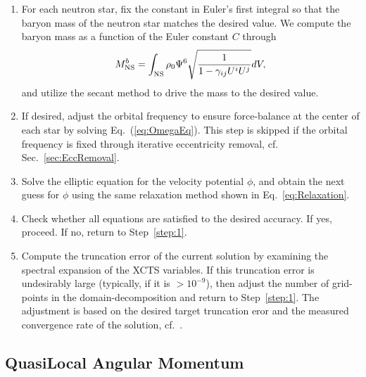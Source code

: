 \begin{enumerate}
\item For each neutron star, fix the constant in Euler's first
  integral so that the baryon mass of the neutron star matches the desired
  value. We compute the baryon mass as a function of the Euler constant $C$
through
\begin{equation}
M^b_{\rm NS} = \int_{\rm
  NS}\rho_0\Psi^6\sqrt{\frac{1}{1-\gamma_{ij}U^iU^j}}dV,
\end{equation}
and utilize the secant method
to drive the mass to the desired value.
\item If desired, adjust the orbital frequency to ensure force-balance at the
  center of each star by solving Eq.~(\ref{eq:OmegaEq}). This step is
  skipped if the orbital frequency is fixed through iterative eccentricity removal, cf. Sec.~\ref{sec:EccRemoval}.
\item Solve the elliptic equation for the velocity potential $\phi$,
  and obtain the next guess for $\phi$ using the same relaxation
  method shown in Eq.~\ref{eq:Relaxation}.
\item  Check whether all equations are satisfied to the desired accuracy. If yes, proceed. If no, return to Step~\ref{step:1}.
\item Compute the truncation error of the current solution by
    examining the spectral expansion of the XCTS variables. If this
    truncation error is undesirably large (typically, if it is
    $>10^{-9}$), then adjust the number of grid-points in the
    domain-decomposition and return to Step~\ref{step:1}. The adjustment
is based on the desired target truncation eror and the measured convergence rate of the solution, cf.~\cite{Szilagyi:2014fna}.
\end{enumerate}

\subsection{QuasiLocal Angular Momentum}
\label{sec:QLSpinExplanation}

